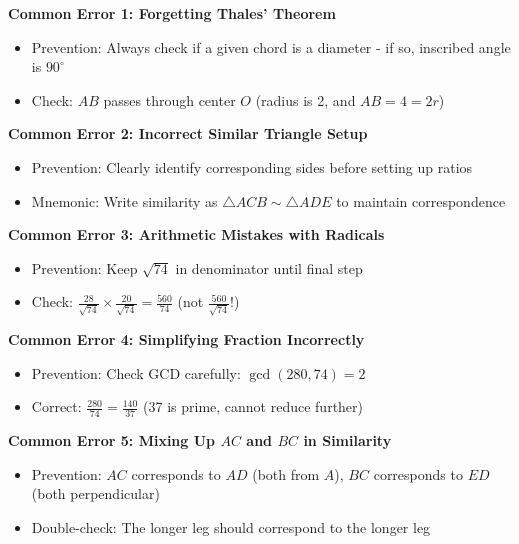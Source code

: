\documentclass[]{article}
\begin{document}
\begin{solutionbox}
\textbf{Common Error 1: Forgetting Thales' Theorem}
\begin{itemize}[leftmargin=*]
    \item Prevention: Always check if a given chord is a diameter - if so, inscribed angle is $90^\circ$
    \item Check: $AB$ passes through center $O$ (radius is 2, and $AB = 4 = 2r$)
\end{itemize}

\textbf{Common Error 2: Incorrect Similar Triangle Setup}
\begin{itemize}[leftmargin=*]
    \item Prevention: Clearly identify corresponding sides before setting up ratios
    \item Mnemonic: Write similarity as $\triangle ACB \sim \triangle ADE$ to maintain correspondence
\end{itemize}

\textbf{Common Error 3: Arithmetic Mistakes with Radicals}
\begin{itemize}[leftmargin=*]
    \item Prevention: Keep $\sqrt{74}$ in denominator until final step
    \item Check: $\frac{28}{\sqrt{74}} \times \frac{20}{\sqrt{74}} = \frac{560}{74}$ (not $\frac{560}{\sqrt{74}}$!)
\end{itemize}

\textbf{Common Error 4: Simplifying Fraction Incorrectly}
\begin{itemize}[leftmargin=*]
    \item Prevention: Check GCD carefully: $\gcd(280, 74) = 2$
    \item Correct: $\frac{280}{74} = \frac{140}{37}$ (37 is prime, cannot reduce further)
\end{itemize}

\textbf{Common Error 5: Mixing Up $AC$ and $BC$ in Similarity}
\begin{itemize}[leftmargin=*]
    \item Prevention: $AC$ corresponds to $AD$ (both from $A$), $BC$ corresponds to $ED$ (both perpendicular)
    \item Double-check: The longer leg should correspond to the longer leg
\end{itemize}
\end{solutionbox}
\end{document}
